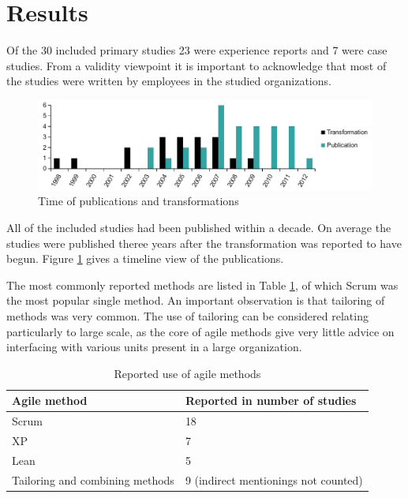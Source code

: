 \documentclass[lnbip]{svmultln}
\begin{document}
\section{Results}
\label{sec:results}

Of the 30 included primary studies 23 were experience reports and 7 were case
studies. From a validity viewpoint it is important to acknowledge that most of
the studies were written by employees in the studied organizations.

\begin{figure}
  \begin{center}
    \includegraphics[width=1\textwidth]{publicationschart.pdf}
    \caption{Time of publications and transformations}
    \label{fig:publications}
  \end{center}
\end{figure}

All of the included studies had been published within a decade. On average the
studies were published theree years after the transformation was reported to
have begun. Figure \ref{fig:publications} gives a timeline view of the
publications.


The most commonly reported methods are listed in Table \ref{table:methods}, of
which Scrum was the most popular single method. An important observation is that
tailoring of methods was very common. The use of tailoring can be considered
relating particularly to large scale, as the core of agile methods give very
little advice on interfacing with various units present in a large organization.

\begin{table}
    \begin{tabular}{ l@{ \hskip 0.4cm } l }
        \toprule
        Agile method    & Reported in number of studies   \\ \midrule
        Scrum           & 18 \\ 
        XP              & 7 \\
        Lean            & 5 \\
        Tailoring and combining methods & 9  (indirect mentionings not counted) \\
        \bottomrule
    \end{tabular}
    \caption{Reported use of agile methods}
    \label{table:methods}
\end{table}
\end{document}
